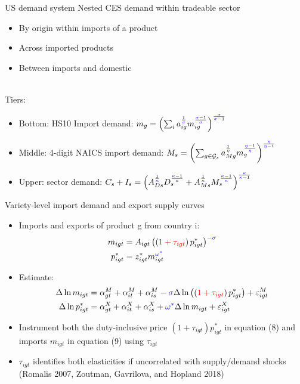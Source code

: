 \documentclass[11pt,notes=hide,aspectratio=169]{beamer}
\begin{document}
\begin{frame}{US demand system}
Nested CES demand within tradeable sector 
\begin{itemize}
	\item By origin within imports of a product
	\item Across imported products
	\item Between imports and domestic \\~\\
\end{itemize}
Tiers:
\begin{itemize}
	\item Bottom: HS10 Import demand: $m_{g}=\left(\sum_{i}a_{ig}^{\frac{1}{{\color{blue}\sigma}}}m_{ig}^{\frac{{\color{blue}\sigma}-1}{{\color{blue}\sigma}}}\right)^{\frac{{\color{blue}\sigma}}{{\color{blue}\sigma}-1}}$
	\item Middle: 4-digit NAICS import demand: $M_{s}=\left(\sum_{g\in\mathcal{G}_{s}}a_{Mg}^{\frac{1}{{\color{blue}\eta}}}m_{g}^{\frac{{\color{blue}\eta}-1}{{\color{blue}\eta}}}\right)^{\frac{{\color{blue}\eta}}{{\color{blue}\eta}-1}}$
	\item Upper: sector demand: $C_{s}+I_{s}=\left(A_{Ds}^{\frac{1}{{\color{blue}\kappa}}}D_{s}^{\frac{{\color{blue}\kappa}-1}{{\color{blue}\kappa}}}+A_{Ms}^{\frac{1}{{\color{blue}\kappa}}}M_{s}^{\frac{{\color{blue}\kappa}-1}{{\color{blue}\kappa}}}\right)^{\frac{{\color{blue}\kappa}}{{\color{blue}\kappa}-1}}$
\end{itemize}
\end{frame}
\begin{frame}{Variety-level import demand and export supply curves}
\begin{itemize}
	\item Imports and exports of product g from country i: 
	\begin{align*}
		m_{igt}	&= A_{igt}\left(\left({\color{red}1+\tau_{igt}}\right)p_{igt}^{*}\right)^{-{\color{blue}\sigma}} \\
		p_{igt}^{*}	&= z_{igt}^{*}m_{igt}^{{\color{blue}\omega^{*}}}
	\end{align*}
	\item Estimate:
	\begin{align*}
		\Delta\ln m_{igt} &= \alpha_{gt}^{M}+\alpha_{it}^{M}+\alpha_{is}^{M}-{\color{blue}\sigma}\Delta\ln\left(\left({\color{red}1+\tau_{igt}}\right)p_{igt}^{*}\right)+\varepsilon_{igt}^{M} \\
		\Delta\ln p_{igt}^{*} &= \alpha_{gt}^{X}+\alpha_{it}^{X}+\alpha_{is}^{X}+{\color{blue}\omega^{*}}\Delta\ln m_{igt}+\varepsilon_{igt}^{X}
	\end{align*}
	\item Instrument both the duty-inclusive price $(1+\tau_{igt})p_{igt}^{*}$ in equation (8) and imports $m_{igt}$ in equation (9) using $\tau_{igt}$
	\item {\color{red}$\tau_{igt}$} identifies both elasticities if uncorrelated with supply/demand shocks
	(Romalis 2007, Zoutman, Gavrilova, and Hopland 2018)
\end{itemize}
\end{frame}
\end{document}
